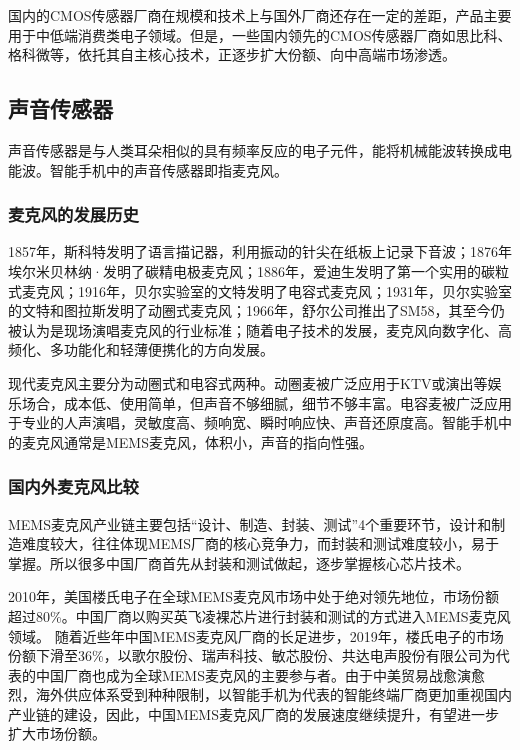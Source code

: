 \documentclass[lang=cn]{elegantpaper}
\begin{document}
国内的CMOS传感器厂商在规模和技术上与国外厂商还存在一定的差距，产品主要用于中低端消费类电子领域。但是，一些国内领先的CMOS传感器厂商如思比科、格科微等，依托其自主核心技术，正逐步扩大份额、向中高端市场渗透。

\subsection{声音传感器}

声音传感器是与人类耳朵相似的具有频率反应的电子元件，能将机械能波转换成电能波。智能手机中的声音传感器即指麦克风。

\subsubsection{麦克风的发展历史}

1857年，斯科特发明了语言描记器，利用振动的针尖在纸板上记录下音波；1876年埃尔米贝林纳·发明了碳精电极麦克风；1886年，爱迪生发明了第一个实用的碳粒式麦克风；1916年，贝尔实验室的文特发明了电容式麦克风；1931年，贝尔实验室的文特和图拉斯发明了动圈式麦克风；1966年，舒尔公司推出了SM58，其至今仍被认为是现场演唱麦克风的行业标准；随着电子技术的发展，麦克风向数字化、高频化、多功能化和轻薄便携化的方向发展。

现代麦克风主要分为动圈式和电容式两种。动圈麦被广泛应用于KTV或演出等娱乐场合，成本低、使用简单，但声音不够细腻，细节不够丰富。电容麦被广泛应用于专业的人声演唱，灵敏度高、频响宽、瞬时响应快、声音还原度高。智能手机中的麦克风通常是MEMS麦克风，体积小，声音的指向性强。

\subsubsection{国内外麦克风比较}


MEMS麦克风产业链主要包括“设计、制造、封装、测试”4个重要环节，设计和制造难度较大，往往体现MEMS厂商的核心竞争力，而封装和测试难度较小，易于掌握。所以很多中国厂商首先从封装和测试做起，逐步掌握核心芯片技术。

2010年，美国楼氏电子在全球MEMS麦克风市场中处于绝对领先地位，市场份额超过80\%。中国厂商以购买英飞凌裸芯片进行封装和测试的方式进入MEMS麦克风领域。 随着近些年中国MEMS麦克风厂商的长足进步，2019年，楼氏电子的市场份额下滑至36\%，以歌尔股份、瑞声科技、敏芯股份、共达电声股份有限公司为代表的中国厂商也成为全球MEMS麦克风的主要参与者。由于中美贸易战愈演愈烈，海外供应体系受到种种限制，以智能手机为代表的智能终端厂商更加重视国内产业链的建设，因此，中国MEMS麦克风厂商的发展速度继续提升，有望进一步扩大市场份额。
\end{document}
